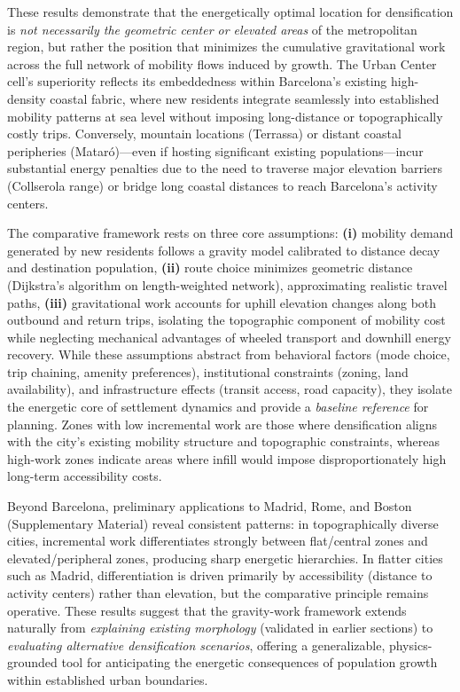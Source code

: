 \documentclass[twocolumn,amsmath,amssymb,floatfix,nature,shownopacs,footinbib,superscriptaddress]{revtex4-1} %
\begin{document}
These results demonstrate that the energetically optimal location for densification is \emph{not necessarily the geometric center or elevated areas} of the metropolitan region, but rather the position that minimizes the cumulative gravitational work across the full network of mobility flows induced by growth.  
The Urban Center cell's superiority reflects its embeddedness within Barcelona's existing high-density coastal fabric, where new residents integrate seamlessly into established mobility patterns at sea level without imposing long-distance or topographically costly trips.  
Conversely, mountain locations (Terrassa) or distant coastal peripheries (Mataró)—even if hosting significant existing populations—incur substantial energy penalties due to the need to traverse major elevation barriers (Collserola range) or bridge long coastal distances to reach Barcelona's activity centers.

The comparative framework rests on three core assumptions:  
\textbf{(i)} mobility demand generated by new residents follows a gravity model calibrated to distance decay and destination population,  
\textbf{(ii)} route choice minimizes geometric distance (Dijkstra's algorithm on length-weighted network), approximating realistic travel paths,  
\textbf{(iii)} gravitational work accounts for uphill elevation changes along both outbound and return trips, isolating the topographic component of mobility cost while neglecting mechanical advantages of wheeled transport and downhill energy recovery.  
While these assumptions abstract from behavioral factors (mode choice, trip chaining, amenity preferences), institutional constraints (zoning, land availability), and infrastructure effects (transit access, road capacity), they isolate the energetic core of settlement dynamics and provide a \emph{baseline reference} for planning.  
Zones with low incremental work are those where densification aligns with the city's existing mobility structure and topographic constraints, whereas high-work zones indicate areas where infill would impose disproportionately high long-term accessibility costs.

Beyond Barcelona, preliminary applications to Madrid, Rome, and Boston (Supplementary Material) reveal consistent patterns: in topographically diverse cities, incremental work differentiates strongly between flat/central zones and elevated/peripheral zones, producing sharp energetic hierarchies.  
In flatter cities such as Madrid, differentiation is driven primarily by accessibility (distance to activity centers) rather than elevation, but the comparative principle remains operative.  
These results suggest that the gravity-work framework extends naturally from \emph{explaining existing morphology} (validated in earlier sections) to \emph{evaluating alternative densification scenarios}, offering a generalizable, physics-grounded tool for anticipating the energetic consequences of population growth within established urban boundaries.
\end{document}
